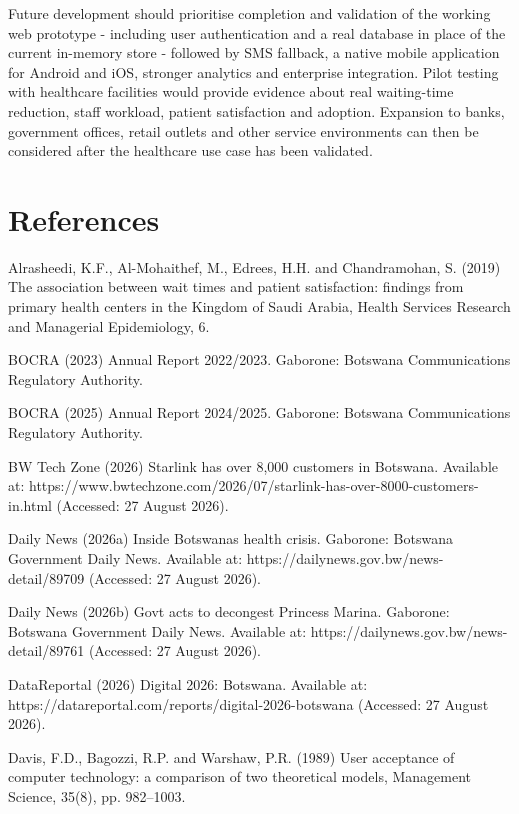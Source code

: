 \documentclass[
]{article}
\begin{document}
Future development should prioritise completion and validation of the
working web prototype - including user authentication and a real
database in place of the current in-memory store - followed by SMS
fallback, a native mobile application for Android and iOS, stronger
analytics and enterprise integration. Pilot testing with healthcare
facilities would provide evidence about real waiting-time reduction,
staff workload, patient satisfaction and adoption. Expansion to banks,
government offices, retail outlets and other service environments can
then be considered after the healthcare use case has been validated.

\section{References}\label{references}

Alrasheedi, K.F., Al-Mohaithef, M., Edrees, H.H. and Chandramohan, S.
(2019) \textquotesingle The association between wait times and patient
satisfaction: findings from primary health centers in the Kingdom of
Saudi Arabia\textquotesingle, Health Services Research and Managerial
Epidemiology, 6.

BOCRA (2023) Annual Report 2022/2023. Gaborone: Botswana Communications
Regulatory Authority.

BOCRA (2025) Annual Report 2024/2025. Gaborone: Botswana Communications
Regulatory Authority.

BW Tech Zone (2026) \textquotesingle Starlink has over 8,000 customers
in Botswana\textquotesingle. Available at:
https://www.bwtechzone.com/2026/07/starlink-has-over-8000-customers-in.html
(Accessed: 27 August 2026).

Daily News (2026a) \textquotesingle Inside Botswana\textquotesingle s
health crisis\textquotesingle. Gaborone: Botswana Government Daily News.
Available at: https://dailynews.gov.bw/news-detail/89709 (Accessed: 27
August 2026).

Daily News (2026b) \textquotesingle Govt acts to decongest Princess
Marina\textquotesingle. Gaborone: Botswana Government Daily News.
Available at: https://dailynews.gov.bw/news-detail/89761 (Accessed: 27
August 2026).

DataReportal (2026) Digital 2026: Botswana. Available at:
https://datareportal.com/reports/digital-2026-botswana (Accessed: 27
August 2026).

Davis, F.D., Bagozzi, R.P. and Warshaw, P.R. (1989)
\textquotesingle User acceptance of computer technology: a comparison of
two theoretical models\textquotesingle, Management Science, 35(8), pp.
982--1003.
\end{document}
